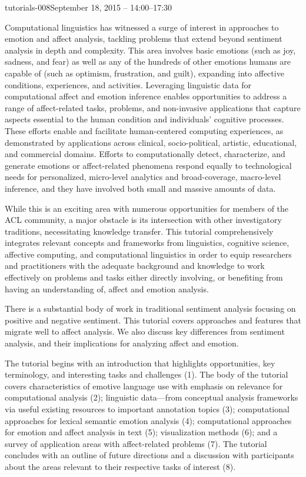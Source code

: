 \begin{tutorial}{tutorials-008}{September 18, 2015 -- 14:00--17:30}
{\TutLocH}

Computational linguistics has witnessed a surge of interest in approaches
to emotion and affect analysis, tackling problems that extend beyond
sentiment analysis in depth and complexity. This area involves basic
emotions (such as joy, sadness, and fear) as well as any of the hundreds
of other emotions humans are capable of (such as optimism, frustration,
and guilt), expanding into affective conditions, experiences, and
activities. Leveraging linguistic data for computational affect and
emotion inference enables opportunities to address a range of affect-related
tasks, problems, and non-invasive applications that capture aspects
essential to the human condition and individuals’ cognitive processes.
These efforts enable and facilitate human-centered computing experiences,
as demonstrated by applications across clinical, socio-political,
artistic, educational, and commercial domains. Efforts to computationally
detect, characterize, and generate emotions or affect-related phenomena
respond equally to technological needs for personalized, micro-level
analytics and broad-coverage, macro-level inference, and they have
involved both small and massive amounts of data.

While this is an exciting area with numerous opportunities for members
of the ACL community, a major obstacle is its intersection with other
investigatory traditions, necessitating knowledge transfer. This tutorial
comprehensively integrates relevant concepts and frameworks from linguistics,
cognitive science, affective computing, and computational linguistics
in order to equip researchers and practitioners with the adequate
background and knowledge to work effectively on problems and tasks
either directly involving, or benefiting from having an understanding
of, affect and emotion analysis.

There is a substantial body of work in traditional sentiment analysis
focusing on positive and negative sentiment. This tutorial covers
approaches and features that migrate well to affect analysis. We also
discuss key differences from sentiment analysis, and their implications
for analyzing affect and emotion.

The tutorial begins with an introduction that highlights opportunities,
key terminology, and interesting tasks and challenges (1). The body
of the tutorial covers characteristics of emotive language use with
emphasis on relevance for computational analysis (2); linguistic data—from
conceptual analysis frameworks via useful existing resources to important
annotation topics (3); computational approaches for lexical semantic
emotion analysis (4); computational approaches for emotion and affect
analysis in text (5); visualization methods (6); and a survey of application
areas with affect-related problems (7). The tutorial concludes with
an outline of future directions and a discussion with participants
about the areas relevant to their respective tasks of interest (8).


\end{tutorial}
